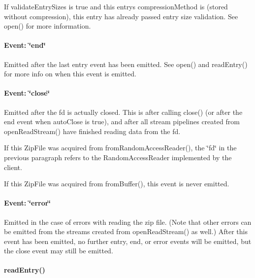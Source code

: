If {\ttfamily validate\+Entry\+Sizes} is {\ttfamily true} and this entry\textquotesingle{}s {\ttfamily compression\+Method} is {} (stored without compression), this entry has already passed entry size validation. See {\ttfamily open()} for more information.

\paragraph*{Event\+: \char`\"{}end\char`\"{}}

Emitted after the last {\ttfamily entry} event has been emitted. See {\ttfamily open()} and {\ttfamily read\+Entry()} for more info on when this event is emitted.

\paragraph*{Event\+: \char`\"{}close\char`\"{}}

Emitted after the fd is actually closed. This is after calling {\ttfamily close()} (or after the {\ttfamily end} event when {\ttfamily auto\+Close} is {\ttfamily true}), and after all stream pipelines created from {\ttfamily open\+Read\+Stream()} have finished reading data from the fd.

If this {\ttfamily Zip\+File} was acquired from {\ttfamily from\+Random\+Access\+Reader()}, the \char`\"{}fd\char`\"{} in the previous paragraph refers to the {\ttfamily Random\+Access\+Reader} implemented by the client.

If this {\ttfamily Zip\+File} was acquired from {\ttfamily from\+Buffer()}, this event is never emitted.

\paragraph*{Event\+: \char`\"{}error\char`\"{}}

Emitted in the case of errors with reading the zip file. (Note that other errors can be emitted from the streams created from {\ttfamily open\+Read\+Stream()} as well.) After this event has been emitted, no further {\ttfamily entry}, {\ttfamily end}, or {\ttfamily error} events will be emitted, but the {\ttfamily close} event may still be emitted.

\paragraph*{read\+Entry()}

